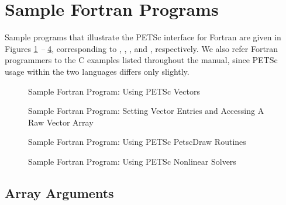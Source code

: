 \section{Sample Fortran Programs}
\label{sec_fortran-examples}

Sample programs that illustrate the PETSc interface for Fortran
are given in Figures \ref{fig_vec-Fortran} {\em --} \ref{fig_SNES-Fortran},
corresponding to
\href{http://www.mcs.anl.gov/petsc/petsc-current/src/vec/vec/examples/tests/ex19f.F.html}{},
\href{http://www.mcs.anl.gov/petsc/petsc-current/src/vec/vec/examples/tutorials/ex4f.F.html}{},
\break 
\href{http://www.mcs.anl.gov/petsc/petsc-current/src/sys/classes/draw/examples/tests/ex5f.F.html}{}, and
\href{http://www.mcs.anl.gov/petsc/petsc-current/src/snes/examples/tutorials/ex1f.F90.html}{}, respectively.  We also
refer Fortran programmers to the C examples listed throughout the manual,
since PETSc usage within the two languages differs only slightly.

\begin{figure}[H]
  
\caption{Sample Fortran Program:  Using PETSc Vectors}
\label{fig_vec-Fortran}
\end{figure}

\begin{figure}[H]
  
\caption{Sample Fortran Program: Setting Vector Entries and Accessing A Raw Vector Array} 
\label{fig_vec2-Fortran}
\end{figure}

\begin{figure}[H]
  
\caption{Sample Fortran Program:  Using PETSc PetscDraw Routines}
\label{fig_draw-Fortran}
\end{figure}

\begin{figure}[H]
  
\caption{Sample Fortran Program:  Using PETSc Nonlinear Solvers}
\label{fig_SNES-Fortran}
\end{figure}

\subsection{Array Arguments}
\label{sec_fortranarrays}

